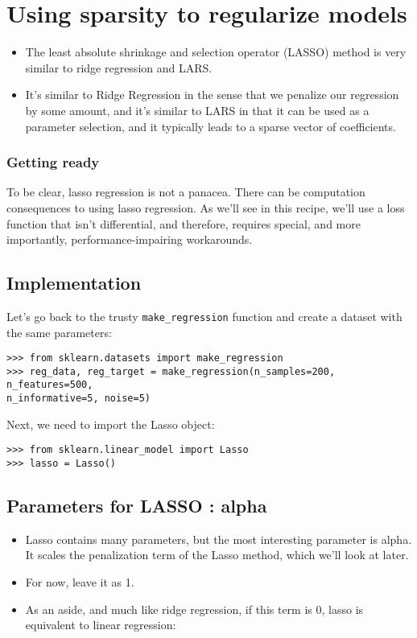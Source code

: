 \documentclass[SKL-MASTER.tex]{subfiles}
\begin{document}
\section{Using sparsity to regularize models}
\begin{itemize}
\item The least absolute shrinkage and selection operator (LASSO) method is very similar
to ridge regression and LARS. 
\item It's similar to Ridge Regression in the sense that we penalize
our regression by some amount, and it's similar to LARS in that it can be used as a parameter
selection, and it typically leads to a sparse vector of coefficients.
\end{itemize}

\subsubsection{Getting ready}
To be clear, lasso regression is not a panacea. There can be computation consequences to
using lasso regression. As we'll see in this recipe, we'll use a loss function that isn't differential,
and therefore, requires special, and more importantly, performance-impairing workarounds.
\subsection{Implementation}
Let's go back to the trusty \texttt{make\_regression} function and create a dataset with the same
parameters:
\begin{framed}
	\begin{verbatim}
>>> from sklearn.datasets import make_regression
>>> reg_data, reg_target = make_regression(n_samples=200, n_features=500,
n_informative=5, noise=5)
\end{verbatim}
\end{framed}
Next, we need to import the Lasso object:
\begin{framed}
\begin{verbatim}
>>> from sklearn.linear_model import Lasso
>>> lasso = Lasso()
\end{verbatim}
\end{framed}
\subsection{Parameters for LASSO : alpha}
\begin{itemize}
\item Lasso contains many parameters, but the most interesting parameter is alpha. It scales
the penalization term of the Lasso method, which we'll look at later.
\item For now, leave it as 1.
\item As an aside, and much like ridge regression, if this term is 0, lasso is
equivalent to linear regression:
\end{itemize}
\end{document}
